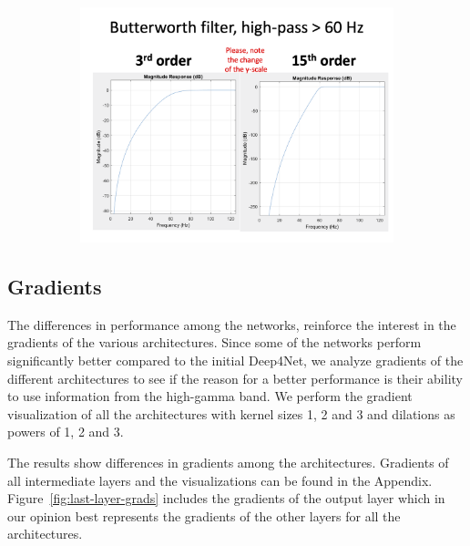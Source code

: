 \begin{figure}[!htpb]
\begin{subfigure}[b]{0.65\textwidth}
   \includegraphics[width=1\linewidth]{img/ch3/hp-butterworth-filter}
   \caption{}
\end{subfigure}
\caption[]{}\label{fig:hp-filters}
\end{figure}\label{fig:filters}

\subsection{Gradients}\label{subsec:gradients}
The differences in performance among the networks, reinforce the interest in the gradients of the various architectures.
Since some of the networks perform significantly better compared to the initial Deep4Net, we analyze gradients of the different architectures to see if the reason for a better performance is their ability to use information from the high-gamma band.
We perform the gradient visualization of all the architectures with kernel sizes 1, 2 and 3 and dilations as powers of 1, 2 and 3.

The results show differences in gradients among the architectures.
Gradients of all intermediate layers and the visualizations can be found in the Appendix.
Figure~\ref{fig:last-layer-grads} includes the gradients of the output layer which in our opinion best represents the gradients of the other layers for all the architectures.

